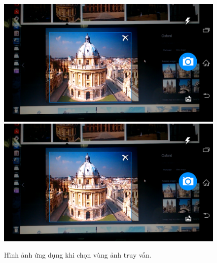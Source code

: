 {\begin{figure}[!htbp]
  \begin{center}
    \leavevmode
    \ifpdf
      \includegraphics[scale=0.17]{choose_region}
    \else
      \includegraphics[scale=0.17]{choose_region}
    \fi
    \caption[Hình ảnh ứng dụng khi chọn vùng ảnh truy vấn]{Hình ảnh ứng dụng khi chọn vùng ảnh truy vấn.}
    \label{FigChooseRegion}
  \end{center}
\end{figure}

}
